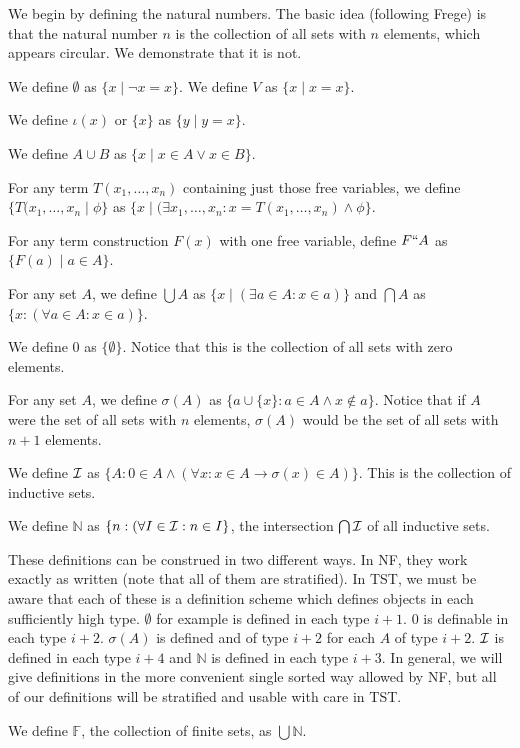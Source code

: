 \documentclass[12pt]{article}
\begin{document}
We begin by defining the natural numbers.  The basic idea (following Frege) is that the natural number $n$ is the collection of all sets with $n$ elements, which appears circular.  We demonstrate that it is not.

We define $\emptyset$ as $\{x\mid \neg x=x\}$.  We define $V$ as $\{x\mid x=x\}$.

We define $\iota(x)$ or $\{x\}$ as $\{y\mid y=x\}$.

We define $A \cup B$ as $\{x\mid x \in A \vee x \in B\}$.

For any term $T(x_1,\ldots,x_n)$ containing just those free variables, we define $\{T(x_1,\ldots,x_n\mid \phi\}$ as $\{x\mid (\exists x_1,\ldots,x_n:x=T(x_1,\ldots,x_n) \wedge \phi\}$.

For any term construction $F(x)$ with one free variable, define $F``A$ as $\{F(a)\mid a \in A\}$.

For any set $A$, we define $\bigcup A$ as $\{x\mid (\exists a \in A:x \in a)\}$ and $\bigcap A$ as $\{x:(\forall a\in A:x \in a)\}$.

We define 0 as $\{\emptyset\}$.  Notice that this is the collection of all sets with zero elements.

For any set $A$, we define $\sigma(A)$ as $\{a \cup \{x\}:a \in A \wedge x \not\in a\}$.  Notice that if $A$ were the set of all sets with $n$ elements, $\sigma(A)$ would be the set of all sets with $n+1$ elements.

We define $\cal I$ as $\{A:0 \in A \wedge (\forall x:x \in A \rightarrow \sigma(x)\in A)\}$.  This is the collection of inductive sets.

We define $\mathbb N$ as $\{n:(\forall I \in {\cal I}:n \in I\}$, the intersection $\bigcap \cal I$ of all inductive sets.

These definitions can be construed in two different ways.  In NF, they work exactly as written (note that all of them are stratified).  In TST, we must be aware that each of these is a definition scheme which defines objects in each sufficiently high type.
$\emptyset$ for example is defined in each type $i+1$.  0 is definable in each type $i+2$.  $\sigma(A)$ is defined and of type $i+2$ for each $A$ of type $i+2$.  $\cal I$ is defined in each type $i+4$ and
$\mathbb N$ is defined in each type $i+3$.  In general, we will give definitions in the more convenient single sorted way allowed by NF, but all of our definitions will be stratified and  usable with care in TST.

We define $\mathbb F$, the collection of finite sets, as $\bigcup \mathbb N$.
\end{document}
